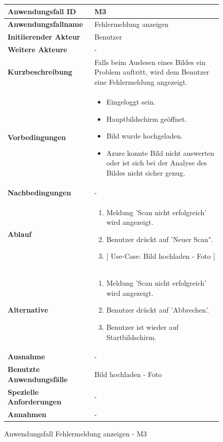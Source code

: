 \begin{figure}[H]
	\centering
	\begin{tabularx}{\textwidth}{ X | X }
		\textbf{Anwendungsfall ID} & M3 \\ \hline
		\textbf{Anwendungsfallname} & Fehlermeldung anzeigen \\ \hline
		\textbf{Initiierender Akteur} & Benutzer \\ \hline
		\textbf{Weitere Akteure} & - \\ \hline
		\textbf{Kurzbeschreibung} & Falls beim Auslesen eines Bildes ein Problem auftritt, wird dem Benutzer eine Fehlermeldung angezeigt.   \\ \hline
		\textbf{Vorbedingungen} & 
		\begin {itemize}
			\item Eingeloggt sein. 
			\item Hauptbildschirm geöffnet.
			\item Bild wurde hochgeladen.
			\item Azure konnte Bild nicht auswerten oder ist sich bei der Analyse des Bildes nicht sicher genug.
		\end{itemize}\\ \hline
		\textbf{Nachbedingungen} & - \\ \hline
		\textbf{Ablauf} &
		\begin{enumerate}
			\item Meldung 'Scan nicht erfolgreich' wird angezeigt.
			\item Benutzer drückt auf 'Neuer Scan".
			\item $\lbrack$ Use-Case: Bild hochladen - Foto $\rbrack$
		\end{enumerate} \\ \hline
		\textbf{Alternative} & 
		\begin{enumerate}
			\item Meldung 'Scan nicht erfolgreich' wird angezeigt.
			\item Benutzer drückt auf 'Abbrechen'.
			\item Benutzer ist wieder auf Startbildschirm.
		\end{enumerate} \\ \hline
		\textbf{Ausnahme} & -   \\ \hline
		\textbf{Benutzte Anwendungsfälle} & Bild hochladen - Foto \\ \hline
		\textbf{Spezielle Anforderungen} & - \\ \hline
		\textbf{Annahmen} & -
	\end{tabularx}
	\caption{Anwendungsfall Fehlermeldung anzeigen - M3}
	\label{fig:anwendungsfall-server-tabelle-xx-1}
\end{figure}

